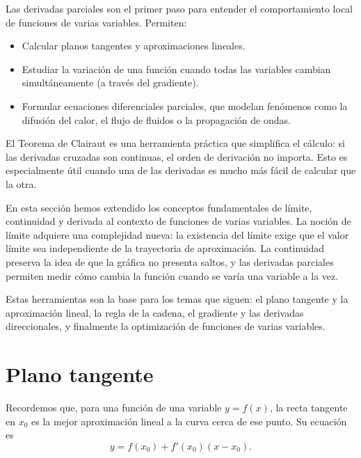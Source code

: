 
Las derivadas parciales son el primer paso para entender el
comportamiento local de funciones de varias variables. Permiten:
\begin{itemize}
    \item Calcular planos tangentes y aproximaciones lineales.
    \item Estudiar la variación de una función cuando todas las
    variables cambian simultáneamente (a través del gradiente).
    \item Formular ecuaciones diferenciales parciales, que modelan
    fenómenos como la difusión del calor, el flujo de fluidos o la
    propagación de ondas.
\end{itemize}

\begin{rem}
El Teorema de Clairaut es una herramienta práctica que simplifica el
cálculo: si las derivadas cruzadas son continuas, el orden de
derivación no importa. Esto es especialmente útil cuando una de las
derivadas es mucho más fácil de calcular que la otra.
\end{rem}


En esta sección hemos extendido los conceptos fundamentales de límite, continuidad y derivada al contexto de funciones de varias variables. La noción de límite adquiere una complejidad nueva: la existencia del límite exige que el valor límite sea independiente de la trayectoria de aproximación. La continuidad preserva la idea de que la gráfica no presenta saltos, y las derivadas parciales permiten medir cómo cambia la función cuando se varía una variable a la vez.

Estas herramientas son la base para los temas que siguen: el plano
tangente y la aproximación lineal, la regla de la cadena, el
gradiente y las derivadas direccionales, y finalmente la optimización
de funciones de varias variables.

\section{Plano tangente}

Recordemos que, para una función de una variable $y=f(x)$, la recta tangente en $x_0$ es la mejor aproximación lineal a la curva cerca de ese punto. Su ecuación es
\[
y = f(x_0) + f'(x_0)(x-x_0).
\]

